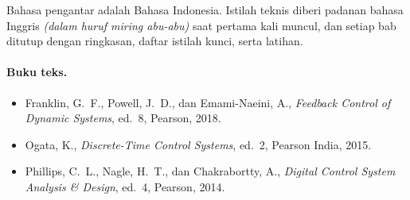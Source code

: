 \documentclass[11pt,a4paper,oneside]{book}
\newcommand{\en}[1]{{\color{skdgray}\textit{#1}}}
\begin{document}
Bahasa pengantar adalah Bahasa Indonesia. Istilah teknis diberi padanan bahasa Inggris \en{(dalam huruf miring abu-abu)} saat pertama kali muncul, dan setiap bab ditutup dengan ringkasan, daftar istilah kunci, serta latihan.

\paragraph{Buku teks.}
\begin{itemize}
	\item[{[FR]}] Franklin, G.~F., Powell, J.~D., dan Emami-Naeini, A., \textit{Feedback Control of Dynamic Systems}, ed.~8, Pearson, 2018.
	\item[{[OG]}] Ogata, K., \textit{Discrete-Time Control Systems}, ed.~2, Pearson India, 2015.
	\item[{[PH]}] Phillips, C.~L., Nagle, H.~T., dan Chakrabortty, A., \textit{Digital Control System Analysis \& Design}, ed.~4, Pearson, 2014.
\end{itemize}

\tableofcontents

\mainmatter















\backmatter

\end{document}
